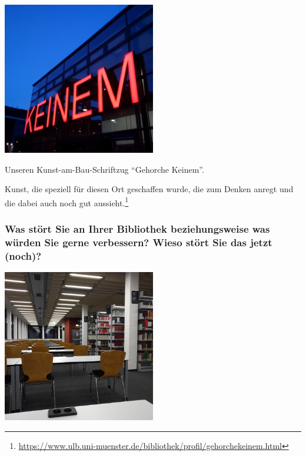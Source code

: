 \begin{center}
\includegraphics[width=0.5\textwidth]{ulb-muenster/img/schriftzug.jpg}
\end{center}

Unseren Kunst-am-Bau-Schriftzug \enquote{Gehorche Keinem}.

Kunst, die speziell für diesen Ort geschaffen wurde, die zum Denken
anregt und die dabei auch noch gut aussieht.\footnote{\href{https://www.ulb.uni-muenster.de/bibliothek/profil/gehorchekeinem.html}{https://www.ulb.uni-muenster.de/bibliothek/profil/gehorchekeinem.html}}

\hypertarget{was-stuxf6rt-sie-an-ihrer-bibliothek-beziehungsweise-was-wuxfcrden-sie-gerne-verbessern-wieso-stuxf6rt-sie-das-jetzt-noch}{%
\subsubsection*{Was stört Sie an Ihrer Bibliothek beziehungsweise was würden
Sie gerne verbessern? Wieso stört Sie das jetzt
(noch)?}\label{was-stuxf6rt-sie-an-ihrer-bibliothek-beziehungsweise-was-wuxfcrden-sie-gerne-verbessern-wieso-stuxf6rt-sie-das-jetzt-noch}}

\begin{center}
\includegraphics[width=0.5\textwidth]{ulb-muenster/img/arbeitsplaetze.jpg}
\end{center}


